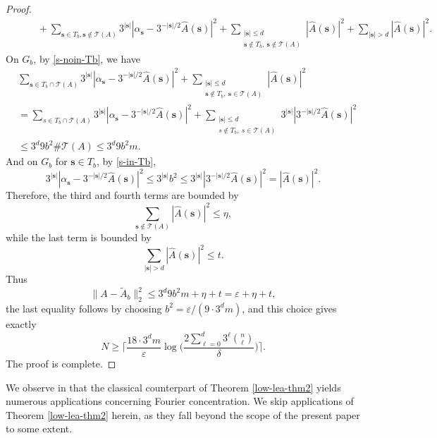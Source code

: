 \documentclass{amsbook}
\theoremstyle{definition}
\theoremstyle{remark}
\numberwithin{section}{chapter}
\numberwithin{equation}{chapter}
\newcommand{\1}{\mathbf{1}}
\newcommand{\s}{\mathbf{s}}
\begin{document}
\begin{proof}
\begin{align*}
		&\qquad
		+\sum_{\s\in T_b,\s\notin\mathcal T(A)}3^{|\s|}|\alpha_{\s}-3^{-|\s|/2}\widehat{A}(\s)|^2
		+\sum_{\substack{|\s|\le d\\ \s\notin T_b,\ \s\notin \mathcal T(A)}}|\widehat{A}(\s)|^2
		+\sum_{|\s|>d}|\widehat{A}(\s)|^2.
	\end{align*}
	On $G_b$, by \eqref{s-noin-Tb}, we have
\begin{align*}
&\sum_{\s\in T_b\cap \mathcal T(A)}3^{|\s|}|\alpha_{\s}-3^{-|\s|/2}\widehat{A}(\s)|^2
+\sum_{\substack{|\s|\le d\\ \s\notin T_b,\ \s\in \mathcal T(A)}}|\widehat{A}(\s)|^2\\
&=\sum_{s\in T_b\cap \mathcal T(A)}3^{|\s|}|\alpha_{\s}-3^{-|\s|/2}\widehat{A}(\s)|^2
+\sum_{\substack{|\s|\le d\\ s\notin T_b,\ s\in \mathcal T(A)}}3^{|\s|}|3^{-|\s|/2}\widehat{A}(\s)|^2\\
&\leq 3^d9b^2\#\mathcal T(A)\leq 3^d9b^2m.
\end{align*}
	And  on $G_b$ for $\s\in T_b$, by \eqref{s-in-Tb}, 
	\[3^{|\s|}|\alpha_{\s}-3^{-|\s|/2}\widehat{A}(\s)|^2\le 3^{|\s|}b^2\le 3^{|\s|}|3^{-|\s|/2}\widehat{A}(\s)|^2=|\widehat{A}(\s)|^2.
	\]
	Therefore, the third and fourth terms are bounded by
	\[
	\sum_{\s\notin \mathcal T(A)}|\widehat A(\s)|^2
	\le \eta,
	\]
	while the last term is bounded by
	\[
	\sum_{|\s|>d}|\widehat A(\s)|^2\le t.
	\]
	Thus
	\[
	\|A-\widetilde A_b\|_{2}^2\le 3^d9b^2m+\eta+t=\varepsilon+\eta+t,
	\]
	the last equality follows by choosing $b^2=\varepsilon/(9\cdot3^dm)$, and this choice gives exactly
	\[
	N\ge
	\Big\lceil
	\frac{18\cdot 3^dm}{\varepsilon}
	\log \Big(\frac{2\sum_{\ell=0}^d 3^\ell\binom{n}{\ell}}{\delta}\Big)
	\Big\rceil.
	\]
	The proof is complete.
\end{proof}


We observe in \cite{EIS2023} that  the classical counterpart of Theorem \ref{low-lea-thm2}  yields numerous applications concerning Fourier concentration. We skip  applications of Theorem \ref{low-lea-thm2} herein, as they fall beyond the scope of the present paper to some extent.
\end{document}
